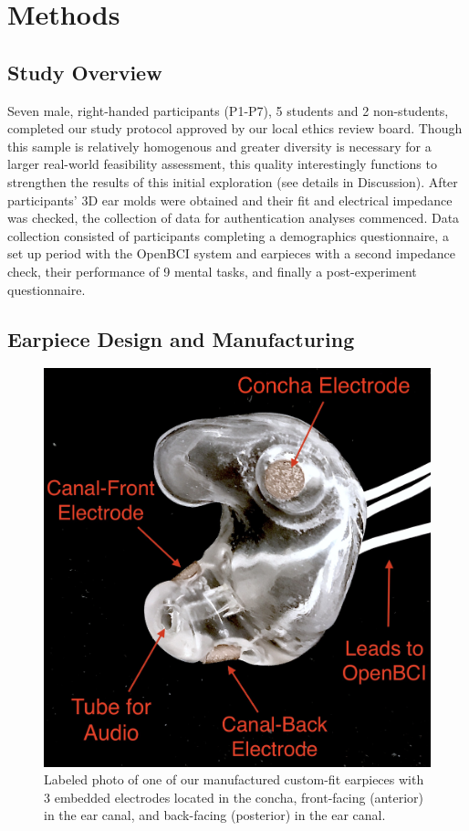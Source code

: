 \documentclass{sigchi}
\begin{document}
\section{Methods}

\subsection{Study Overview}

Seven male, right-handed participants (P1-P7), 5 students and 2 non-students, completed our study protocol approved by our local ethics review board. Though this sample is relatively homogenous and greater diversity is necessary for a larger real-world feasibility assessment, this quality interestingly functions to strengthen the results of this initial exploration (see details in Discussion). After participants' 3D ear molds were obtained and their fit and electrical impedance was checked, the collection of data for authentication analyses commenced. Data collection consisted of participants completing a demographics questionnaire, a set up period with the OpenBCI system and earpieces with a second impedance check, their performance of 9 mental tasks, and finally a post-experiment questionnaire.

\subsection{Earpiece Design and Manufacturing}

\begin{figure}[htbp]
\centering
\includegraphics[width=.75\linewidth]{./figures/CFEEEG_piecefig_Right.jpg}
\caption{Labeled photo of one of our manufactured custom-fit earpieces with 3 embedded electrodes located in the concha, front-facing (anterior) in the ear canal, and back-facing (posterior) in the ear canal.}
\label{fig:earpiece_diagram}
\end{figure}
\end{document}
